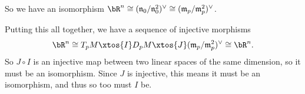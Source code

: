     So we have an isomorphism $\bR^n\cong(\n_0/\n_0^2)^\vee\cong(\m_p/\m_p^2)^\vee$.

    \item Putting this all together, we have a sequence of injective morphisms
    $$ \bR^n \cong T_pM \xtos{I} D_pM \xtos{J} (\m_p/\m_p^2)^\vee \cong \bR^n . $$
    So $J\circ I$ is an injective map between two linear spaces of the same dimension, so it must be an isomorphism.
    Since $J$ is injective, this means it must be an isomorphism, and thus so too must $I$ be.
\eenum



